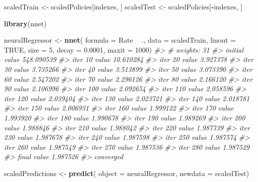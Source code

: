 \documentclass[]{book}
\newenvironment{Shaded}{\begin{snugshade}}{\end{snugshade}}
\newcommand{\CommentTok}[1]{\textcolor[rgb]{0.56,0.35,0.01}{\textit{#1}}}
\newcommand{\DataTypeTok}[1]{\textcolor[rgb]{0.13,0.29,0.53}{#1}}
\newcommand{\DecValTok}[1]{\textcolor[rgb]{0.00,0.00,0.81}{#1}}
\newcommand{\FloatTok}[1]{\textcolor[rgb]{0.00,0.00,0.81}{#1}}
\newcommand{\KeywordTok}[1]{\textcolor[rgb]{0.13,0.29,0.53}{\textbf{#1}}}
\newcommand{\NormalTok}[1]{#1}
\newcommand{\OperatorTok}[1]{\textcolor[rgb]{0.81,0.36,0.00}{\textbf{#1}}}
\newcommand{\OtherTok}[1]{\textcolor[rgb]{0.56,0.35,0.01}{#1}}
\newcommand{\StringTok}[1]{\textcolor[rgb]{0.31,0.60,0.02}{#1}}
\begin{document}
\begin{Shaded}
\begin{Highlighting}[]
\NormalTok{scaledTrain <-}\StringTok{ }\NormalTok{scaledPolicies[indexes, ]}
\NormalTok{scaledTest <-}\StringTok{ }\NormalTok{scaledPolicies[}\OperatorTok{-}\NormalTok{indexes, ]}
\end{Highlighting}
\end{Shaded}

\begin{Shaded}
\begin{Highlighting}[]
\KeywordTok{library}\NormalTok{(nnet)}

\NormalTok{neuralRegressor <-}\StringTok{ }\KeywordTok{nnet}\NormalTok{(}
  \DataTypeTok{formula =}\NormalTok{ Rate }\OperatorTok{~}\StringTok{ }\NormalTok{.,}
  \DataTypeTok{data =}\NormalTok{ scaledTrain,}
  \DataTypeTok{linout =} \OtherTok{TRUE}\NormalTok{,}
  \DataTypeTok{size =} \DecValTok{5}\NormalTok{,}
  \DataTypeTok{decay =} \FloatTok{0.0001}\NormalTok{,}
  \DataTypeTok{maxit =} \DecValTok{1000}\NormalTok{)}
\CommentTok{#> # weights:  31}
\CommentTok{#> initial  value 548.090539 }
\CommentTok{#> iter  10 value 10.610284}
\CommentTok{#> iter  20 value 3.927378}
\CommentTok{#> iter  30 value 3.735266}
\CommentTok{#> iter  40 value 3.513899}
\CommentTok{#> iter  50 value 3.073390}
\CommentTok{#> iter  60 value 2.547202}
\CommentTok{#> iter  70 value 2.296126}
\CommentTok{#> iter  80 value 2.166120}
\CommentTok{#> iter  90 value 2.106996}
\CommentTok{#> iter 100 value 2.092654}
\CommentTok{#> iter 110 value 2.058596}
\CommentTok{#> iter 120 value 2.039404}
\CommentTok{#> iter 130 value 2.023721}
\CommentTok{#> iter 140 value 2.018781}
\CommentTok{#> iter 150 value 2.006931}
\CommentTok{#> iter 160 value 1.999122}
\CommentTok{#> iter 170 value 1.993920}
\CommentTok{#> iter 180 value 1.990678}
\CommentTok{#> iter 190 value 1.989269}
\CommentTok{#> iter 200 value 1.988846}
\CommentTok{#> iter 210 value 1.988042}
\CommentTok{#> iter 220 value 1.987739}
\CommentTok{#> iter 230 value 1.987678}
\CommentTok{#> iter 240 value 1.987598}
\CommentTok{#> iter 250 value 1.987574}
\CommentTok{#> iter 260 value 1.987549}
\CommentTok{#> iter 270 value 1.987536}
\CommentTok{#> iter 280 value 1.987529}
\CommentTok{#> final  value 1.987526 }
\CommentTok{#> converged}
\end{Highlighting}
\end{Shaded}

\begin{Shaded}
\begin{Highlighting}[]
\NormalTok{scaledPredictions <-}\StringTok{ }\KeywordTok{predict}\NormalTok{(}
  \DataTypeTok{object =}\NormalTok{ neuralRegressor, }
  \DataTypeTok{newdata =}\NormalTok{ scaledTest)}
\end{Highlighting}
\end{Shaded}
\end{document}
